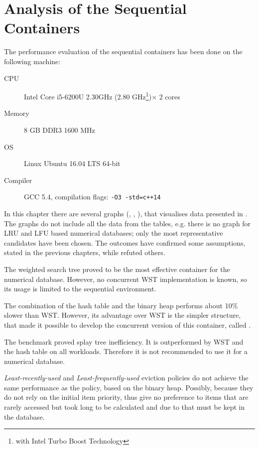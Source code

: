 \section{Analysis of the Sequential Containers}

\label{sec:secanalysis}

The performance evaluation of the sequential containers has been done on the following machine:

\begin{description}
    \item [CPU] Intel\textsuperscript{\textregistered{}} Core\textsuperscript{\texttrademark{}} i5-6200U
    2.30GHz (2.80 GHz\footnote{with Intel\textsuperscript{\textregistered{}} Turbo Boost Technology})$ \times$ 2 cores
    \item [Memory] 8 GB DDR3 1600 MHz
    \item [OS] Linux\textsuperscript{\textregistered{}} Ubuntu\textsuperscript{\textregistered{}} 16.04 LTS 64-bit
    \item [Compiler] GCC 5.4, compilation flags: \texttt{-O3 -std=c++14}
    \end{description}

In this chapter there are several graphs (, , ), that visualises data presented in . The graphs do not include all the data from the tables, e.g. there is no graph for LRU and LFU based numerical databases; only the most representative candidates have been chosen. The outcomes have confirmed some assumptions, stated in the previous chapters, while refuted others.

The weighted search tree proved to be the most effective container for the numerical database. However, no concurrent WST implementation is known, so its usage is limited to the sequential environment.

The combination of the hash table and the binary heap performs about 10\% slower than WST. However, its advantage over WST is the simpler structure, that made it possible to develop the concurrent version of this container, called \cndcname.

The benchmark proved splay tree inefficiency. It is outperformed by WST and the hash table on all workloads. Therefore it is not recommended to use it for a numerical database.

\emph{Least-recently-used} and \emph{Least-frequently-used} eviction policies do not achieve the same performance as the policy, based on the binary heap. Possibly, because they do not rely on the initial item priority, thus give no preference to items that are rarely accessed  but took long to be calculated and due to that must be kept in the database.

